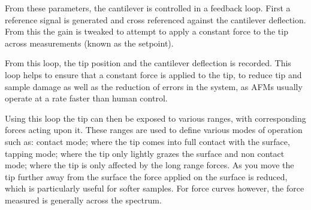 From these parameters, the cantilever is controlled in a feedback loop. First a reference signal is generated and cross referenced against the cantilever deflection. From this the gain is tweaked to attempt to apply a constant force to the tip across measurements (known as the setpoint).


From this loop, the tip position and the cantilever deflection is recorded. This loop helps to ensure that a constant force is applied to the tip, to reduce tip and sample damage as well as the reduction of errors in the system, as AFMs usually operate at a rate faster than human control. \cite{GoodAFM}\cite{AFMTut}


Using this loop the tip can then be exposed to various ranges, with corresponding forces acting upon it. These ranges are used to define various modes of operation such as: contact mode; where the tip comes into full contact with the surface, tapping mode; where the tip only lightly grazes the surface and non contact mode; where the tip is only affected by the long range forces. As you move the tip further away from the surface the force applied on the surface is reduced, which is particularly useful for softer samples. For force curves however, the force measured is generally across the spectrum. \cite{GoodAFM}\cite{AFMTut}

